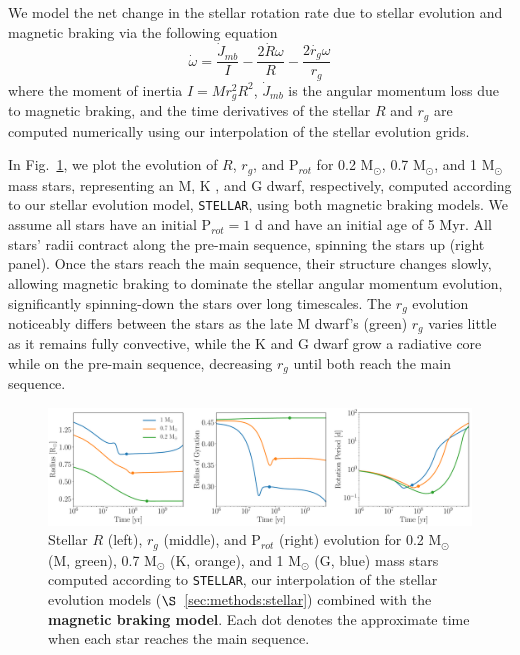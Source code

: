 \documentclass[twocolumn]{aastex61}
\newcommand{\xxx}[1]{{\textbf{#1}}}
\newcommand{\stellar}[0]{\texttt{STELLAR}\xspace}
\begin{document}
We model the net change in the stellar rotation rate due to stellar evolution and magnetic braking via the following equation 
\begin{equation} \label{eqn:stellar_rot_rate_dt}
\dot{\omega} = \frac{\dot{J}_{mb}}{I} - \frac{2 \dot{R} \omega}{R} - \frac{2 \dot{r_g} \omega}{r_g}
\end{equation}
where the moment of inertia $I = M r_g^2 R^2$, $\dot{J}_{mb}$ is the angular momentum loss due to magnetic braking, and the time derivatives of the stellar $R$ and $r_g$ are computed numerically using our interpolation of the \citet{Baraffe2015} stellar evolution grids.  

In Fig.~\ref{fig:stellarExample}, we plot the evolution of $R$, $r_g$, and P$_{rot}$ for 0.2 M$_{\odot}$, 0.7 M$_{\odot}$, and 1 M$_{\odot}$ mass stars, representing an M, K , and G dwarf, respectively, computed according to our stellar evolution model, \stellar, using both magnetic braking models. We assume all stars have an initial P$_{rot} = 1$ d and have an initial age of 5 Myr. All stars' radii contract along the pre-main sequence, spinning the stars up (right panel). Once the stars reach the main sequence, their structure changes slowly, allowing magnetic braking to dominate the stellar angular momentum evolution, significantly spinning-down the stars over long timescales. The $r_g$ evolution noticeably differs between the stars as the late M dwarf's (green) $r_g$ varies little as it remains fully convective, while the K and G dwarf grow a radiative core while on the pre-main sequence, decreasing $r_g$ until both reach the main sequence.


\begin{figure}[ht]
	\includegraphics[width=\textwidth]{../Plots/stellarExample.pdf}
   \caption{Stellar $R$ (left), $r_g$ (middle), and P$_{rot}$ (right) evolution for 0.2 M$_{\odot}$ (M, green), 0.7 M$_{\odot}$ (K, orange), and 1 M$_{\odot}$ (G, blue) mass stars computed according to \stellar, our interpolation of the \citet{Baraffe2015} stellar evolution models ($\S$~\ref{sec:methods:stellar}) combined with the \xxx{\citet{Matt2015} magnetic braking model}. Each dot denotes the approximate time when each star reaches the main sequence.}%
    \label{fig:stellarExample}%
\end{figure}
\end{document}
